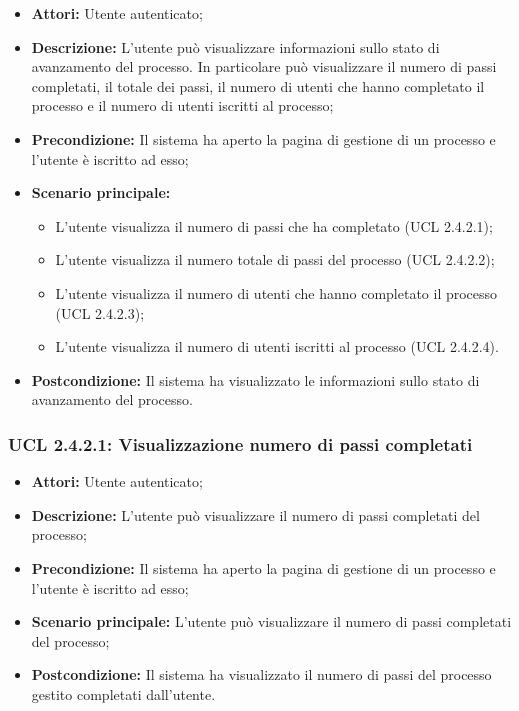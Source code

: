 \begin{itemize}
\item \textbf{Attori:} Utente autenticato;
\item \textbf{Descrizione:} L'utente può visualizzare informazioni sullo stato di avanzamento del processo. In particolare può visualizzare il numero di passi completati, il totale dei passi, il numero di utenti che hanno completato il processo e il numero di utenti iscritti al processo;
\item \textbf{Precondizione:} Il sistema ha aperto la pagina di gestione di un processo e l'utente è iscritto ad esso;
\item \textbf{Scenario principale:}
\begin{itemize}
\item L'utente visualizza il numero di passi che ha completato (UCL 2.4.2.1);
\item L'utente visualizza il numero totale di passi del processo (UCL 2.4.2.2);
\item L'utente visualizza il numero di utenti che hanno completato il processo (UCL 2.4.2.3);
\item L'utente visualizza il numero di utenti iscritti al processo (UCL 2.4.2.4).
\end{itemize}
\item \textbf{Postcondizione:} Il sistema ha visualizzato le informazioni sullo stato di avanzamento del processo.
\end{itemize}

\hypertarget{L2.4.2.1}{}
\subsubsection{UCL 2.4.2.1: Visualizzazione numero di passi completati}
\begin{itemize}
\item \textbf{Attori:} Utente autenticato;
\item \textbf{Descrizione:} L'utente può visualizzare il numero di passi completati del processo;
\item \textbf{Precondizione:} Il sistema ha aperto la pagina di gestione di un processo e l'utente è iscritto ad esso;
\item \textbf{Scenario principale:} L'utente può visualizzare il numero di passi completati del processo;
\item \textbf{Postcondizione:} Il sistema ha visualizzato il numero di passi del processo gestito completati dall'utente.
\end{itemize}

